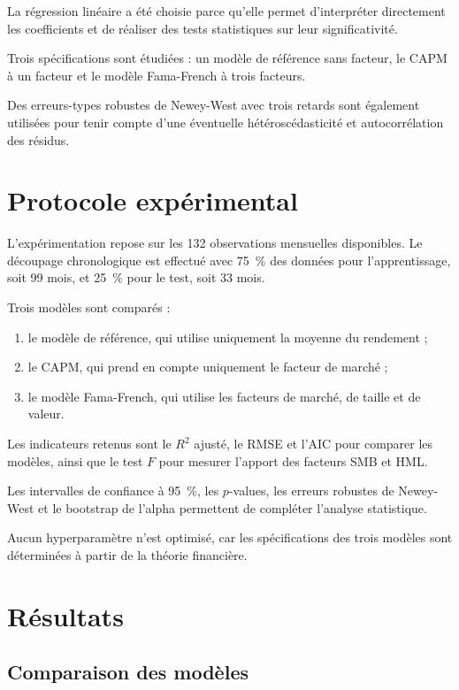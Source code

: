 \documentclass[12pt,a4paper]{article}
\begin{document}
La régression linéaire a été choisie parce qu'elle permet d'interpréter directement les coefficients et de réaliser des tests statistiques sur leur significativité.

Trois spécifications sont étudiées : un modèle de référence sans facteur, le CAPM à un facteur et le modèle Fama-French à trois facteurs.

Des erreurs-types robustes de Newey-West avec trois retards sont également utilisées pour tenir compte d'une éventuelle hétéroscédasticité et autocorrélation des résidus.

\section{Protocole expérimental}

L'expérimentation repose sur les 132 observations mensuelles disponibles. Le découpage chronologique est effectué avec 75~\% des données pour l'apprentissage, soit 99 mois, et 25~\% pour le test, soit 33 mois.

Trois modèles sont comparés :
\begin{enumerate}
    \item le modèle de référence, qui utilise uniquement la moyenne du rendement ;
    \item le CAPM, qui prend en compte uniquement le facteur de marché ;
    \item le modèle Fama-French, qui utilise les facteurs de marché, de taille et de valeur.
\end{enumerate}

Les indicateurs retenus sont le $R^2$ ajusté, le RMSE et l'AIC pour comparer les modèles, ainsi que le test $F$ pour mesurer l'apport des facteurs SMB et HML.

Les intervalles de confiance à 95~\%, les $p$-values, les erreurs robustes de Newey-West et le bootstrap de l'alpha permettent de compléter l'analyse statistique.

Aucun hyperparamètre n'est optimisé, car les spécifications des trois modèles sont déterminées à partir de la théorie financière.

\section{Résultats}

\subsection{Comparaison des modèles}
\end{document}
